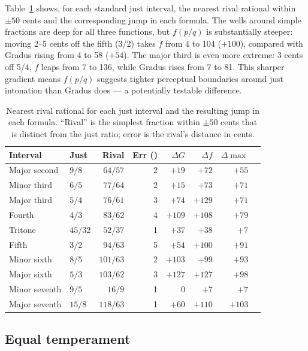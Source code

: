 \documentclass[11pt,a4paper]{article}
\newcommand{\ct}{\textcent}  %
\begin{document}
Table~\ref{tab:rivals} shows, for each standard just interval, the nearest
rival rational within $\pm 50$ cents and the corresponding jump in each
formula. The wells around simple fractions are deep for all three functions,
but $f(p/q)$ is substantially steeper: moving 2--5 cents off the fifth (3/2)
takes $f$ from 4 to 104 ($+100$), compared with Gradus rising from 4 to 58
($+54$). The major third is even more extreme: 3 cents off 5/4, $f$ leaps
from 7 to 136, while Gradus rises from 7 to 81. This sharper gradient means
$f(p/q)$ suggests tighter perceptual boundaries around just intonation than
Gradus does --- a potentially testable difference.

\begin{table}[h]
\centering
\caption{Nearest rival rational for each just interval and the resulting jump
in each formula. ``Rival'' is the simplest fraction within $\pm 50$ cents
that is distinct from the just ratio; error is the rival's distance in cents.}
\label{tab:rivals}
\smallskip
\begin{tabular}{llrrrrrr}
\toprule
Interval & Just & Rival & Err (\ct{}) & $\Delta G$ & $\Delta f$ & $\Delta \max$ \\
\midrule
Major second  & $9/8$   & $64/57$  & 2 & $+19$ & $+72$  & $+55$ \\
Minor third   & $6/5$   & $77/64$  & 2 & $+15$ & $+73$  & $+71$ \\
Major third   & $5/4$   & $76/61$  & 3 & $+74$ & $+129$ & $+71$ \\
Fourth        & $4/3$   & $83/62$  & 4 & $+109$& $+108$ & $+79$ \\
Tritone       & $45/32$ & $52/37$  & 1 & $+37$ & $+38$  & $+7$  \\
Fifth         & $3/2$   & $94/63$  & 5 & $+54$ & $+100$ & $+91$ \\
Minor sixth   & $8/5$   & $101/63$ & 2 & $+103$& $+99$  & $+93$ \\
Major sixth   & $5/3$   & $103/62$ & 3 & $+127$& $+127$ & $+98$ \\
Minor seventh & $9/5$   & $16/9$   & 1 & $0$   & $+7$   & $+7$  \\
Major seventh & $15/8$  & $118/63$ & 1 & $+60$ & $+110$ & $+103$ \\
\bottomrule
\end{tabular}
\end{table}

\subsection*{Equal temperament}
\end{document}
